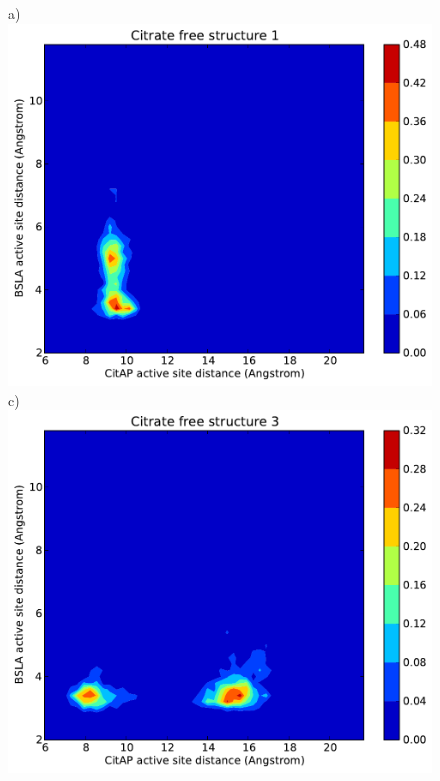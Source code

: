 \documentclass[english, a4paper, 12pt, titlepage, draft]{article}
\begin{document}
\begin{figure}
    \begin{minipage}[]{0.45\linewidth}
        \centering
        a)
        \includegraphics[width=\textwidth]{figures/CitAP_BSLA_distance/BSLA_CitAP_distance_free_contour_structure1.pdf}  
        c)
        \includegraphics[width=\textwidth]{figures/CitAP_BSLA_distance/BSLA_CitAP_distance_free_contour_structure3.pdf}  

\end{minipage}
\end{figure}
\end{document}
